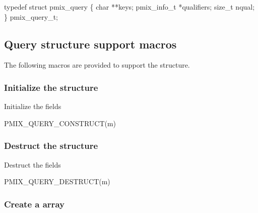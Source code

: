 \cspecificstart
\begin{codepar}
typedef struct pmix_query \{
    char **keys;
    pmix_info_t *qualifiers;
    size_t nqual;
\} pmix_query_t;
\end{codepar}
\cspecificend

\subsection{Query structure support macros}
The following macros are provided to support the  structure.

\subsubsection{Initialize the  structure}

Initialize the  fields

\cspecificstart
\begin{codepar}
PMIX_QUERY_CONSTRUCT(m)
\end{codepar}
\cspecificend

\begin{arglist}
\end{arglist}

\subsubsection{Destruct the  structure}

Destruct the  fields

\cspecificstart
\begin{codepar}
PMIX_QUERY_DESTRUCT(m)
\end{codepar}
\cspecificend

\begin{arglist}
\end{arglist}

\subsubsection{Create a  array}

